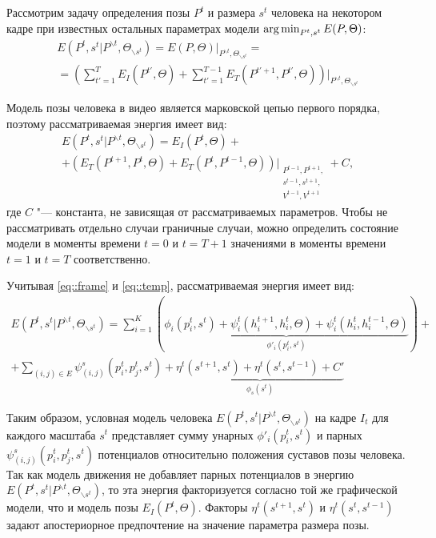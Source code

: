 Рассмотрим задачу определения позы $P^t$ и размера $s^t$ человека на некотором кадре при известных остальных параметрах модели $\operatorname*{arg\,min}_{P^t, s^t} E(P, \Theta)$:
\begin{multline}
	E(P^t, s^t| P^{\backslash t}, \Theta_{\backslash s^t}) = E(P, \Theta)\bigg\rvert_{P^{\backslash t}, \Theta_{\backslash s^t}} = \\ = \left(\sum_{t'=1}^T{E_I(P^{t'}, \Theta)} + \sum_{t'=1}^{T-1}{E_T(P^{t'+1}, P^{t'}, \Theta)}\right)\bigg\rvert_{P^{\backslash t}, \Theta_{\backslash s^t}}
\end{multline}

Модель позы человека в видео является марковской цепью первого порядка, поэтому рассматриваемая энергия имеет вид:
\begin{multline}
	E(P^t, s^t| P^{\backslash t}, \Theta_{\backslash s^t}) = E_I(P^{t}, \Theta) + \\ + \left(E_T(P^{t+1}, P^{t}, \Theta) + E_T(P^{t}, P^{t-1}, \Theta)\right)\bigg\rvert_{\substack{P^{t-1}, P^{t+1}, \\ s^{t-1}, s^{t+1}, \\ V^{t-1}, V^{t+1}}} + C,
\end{multline}
где $C$ "--- константа, не зависящая от рассматриваемых параметров. Чтобы не рассматривать отдельно случаи граничные случаи, можно определить состояние модели в моменты времени $t=0$ и $t=T+1$ значениями в моменты времени $t=1$ и $t=T$ соответственно.

Учитывая \eqref{eq::frame} и \eqref{eq::temp}, рассматриваемая энергия имеет вид:
\begin{multline}
	E(P^t, s^t| P^{\backslash t}, \Theta_{\backslash s^t}) =
	 \sum_{i=1}^K{
	 	\left(\underbrace{\phi_i(p_i^t, s^t) +
	 		 \psi_i^t(h_i^{t+1}, h_i^{t}, \Theta) +
	 		 \psi_i^t(h_i^{t}, h_i^{t-1}, \Theta)}_{\phi'_i(p_i^t, s^t)} \right)} + \\ +
 		  \sum_{\left(i,j\right)\in E}{
 		  	\psi_{(i,j)}^s(p_i^t, p_j^t, s^t)} +
 	  	  \underbrace{\eta^t(s^{t+1}, s^{t}) + \eta^t(s^{t}, s^{t-1}) + C'}_{\phi_s(s^t)}
\end{multline}

Таким образом, условная модель человека $E(P^t, s^t| P^{\backslash t}, \Theta_{\backslash s^t})$ на кадре $I_t$ для каждого масштаба $s^t$ представляет сумму унарных $\phi'_i(p_i^t, s^t)$ и парных $\psi^s_{(i,j)}(p_i^t, p_j^t, s^t)$ потенциалов относительно положения суставов позы человека. Так как модель движения не добавляет парных потенциалов в энергию $E(P^t, s^t| P^{\backslash t}, \Theta_{\backslash s^t})$, то эта энергия факторизуется согласно той же графической модели, что и модель позы $E_I(P^t, \Theta)$. Факторы $\eta^t(s^{t+1}, s^t)$ и $\eta^t(s^t, s^{t-1})$ задают апостериорное предпочтение на значение параметра размера позы.

